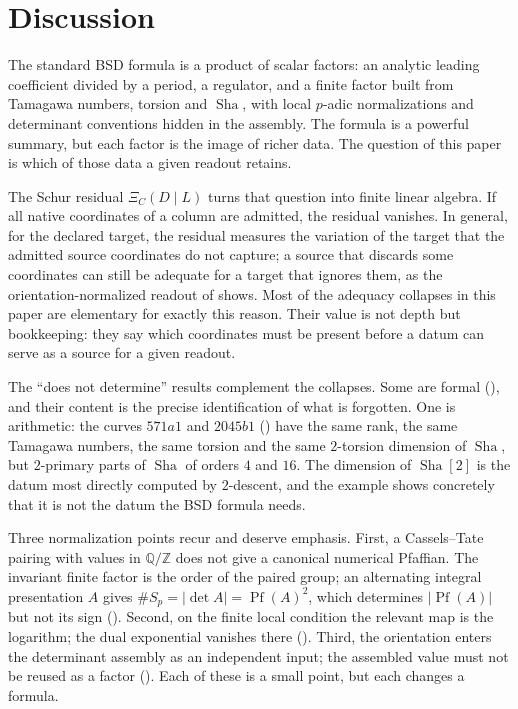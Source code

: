 \documentclass[11pt]{article}
\theoremstyle{definition}
\newcommand{\Q}{\mathbb{Q}}
\newcommand{\Z}{\mathbb{Z}}
\newcommand{\Sha}{\operatorname{Sha}}
\newcommand{\Pf}{\operatorname{Pf}}
\newcommand{\XiC}{\Xi_C(D\mid L)}        \newcommand{\KDD}{K_{DD}}
\begin{document}
 \section{Discussion}\label{sec:discussion}


The standard BSD formula is a product of scalar factors: an analytic
leading coefficient divided by a period, a regulator, and a finite factor
built from Tamagawa numbers, torsion and $\Sha$, with local $p$-adic
normalizations and determinant conventions hidden in the assembly.  The
formula is a powerful summary, but each factor is the image of richer
data.  The question of this paper is which of those data a given readout
retains.

The Schur residual $\XiC$ turns that question into finite linear algebra.
If all native coordinates of a column are admitted, the residual vanishes.
In general, for the declared target, the residual measures the variation
of the target that the admitted source coordinates do not capture; a
source that discards some coordinates can still be adequate for a target
that ignores them, as the orientation-normalized readout of
 shows.  Most of the adequacy
collapses in this paper are elementary for exactly this reason.  Their
value is not depth but bookkeeping: they say which coordinates must be
present before a datum can serve as a source for a given readout.

The ``does not determine'' results complement the collapses.  Some are
formal (),
and their content is the precise identification of what is forgotten.
One is arithmetic: the curves $571a1$ and $2045b1$
() have the same rank, the same Tamagawa
numbers, the same torsion and the same $2$-torsion dimension of $\Sha$,
but $2$-primary parts of $\Sha$ of orders $4$ and $16$.  The dimension of
$\Sha[2]$ is the datum most directly computed by $2$-descent, and the
example shows concretely that it is not the datum the BSD formula needs.

Three normalization points recur and deserve emphasis.  First, a
Cassels--Tate pairing with values in $\Q/\Z$ does not give a canonical
numerical Pfaffian.  The invariant finite factor is the order of the
paired group; an alternating integral presentation $A$ gives
$\#S_p=|\det A|=\Pf(A)^2$, which determines $|\Pf(A)|$ but not its sign
().  Second, on the finite
local condition the relevant map is the logarithm; the dual exponential
vanishes there ().  Third, the orientation enters the
determinant assembly as an independent input; the assembled value must
not be reused as a factor ().  Each
of these is a small point, but each changes a formula.
\end{document}

